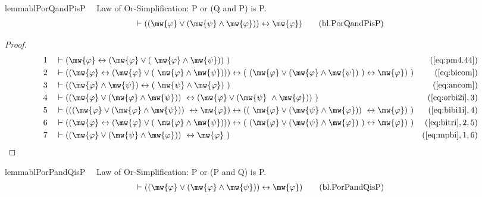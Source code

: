 \begin{restatable}{lemma}{blPorQandPisP}~~ Law of Or-Simplification: P or (Q
and P) is P.
\begin{align}
\vdash ( ( \mw{\varphi} \vee ( \mw{\psi} \wedge \mw{\varphi} ) )
    \leftrightarrow \mw{\varphi} )\label{eq:bl.PorQandPisP}\tag{bl.PorQandPisP}
\end{align}
\end{restatable}

\begin{proof}
\begin{align}
  1 &&  & \vdash ( \mw{\varphi} \leftrightarrow ( \mw{\varphi} \vee (
     ~\mw{\varphi} \wedge \mw{\psi} ) )
     ~)&(\mbox{\ref{eq:pm4.44}})\notag
  \\ 2 &&  & \vdash ( ( \mw{\varphi} \leftrightarrow ( \mw{\varphi} \vee (
     ~\mw{\varphi} \wedge \mw{\psi} ) ) ) \leftrightarrow (
     ~( \mw{\varphi} \vee ( \mw{\varphi} \wedge \mw{\psi} )
     ~) \leftrightarrow \mw{\varphi} )
     ~)&(\mbox{\ref{eq:bicom}})\notag
  \\ 3 &&  & \vdash ( ( \mw{\varphi} \wedge \mw{\psi} ) \leftrightarrow (
     ~\mw{\psi} \wedge \mw{\varphi} )
     ~)&(\mbox{\ref{eq:ancom}})\notag
  \\ 4 &&  & \vdash ( ( \mw{\varphi} \vee ( \mw{\varphi} \wedge \mw{\psi} ) )
     ~\leftrightarrow ( \mw{\varphi} \vee ( \mw{\psi}
     ~\wedge \mw{\varphi} ) )
     ~)&(\mbox{\ref{eq:orbi2i}},3)\notag
  \\ 5 &&  & \vdash ( ( ( \mw{\varphi} \vee ( \mw{\varphi} \wedge \mw{\psi} ) )
     ~\leftrightarrow \mw{\varphi} ) \leftrightarrow ( (
     ~\mw{\varphi} \vee ( \mw{\psi} \wedge \mw{\varphi} ) )
     ~\leftrightarrow \mw{\varphi} )
     ~)&(\mbox{\ref{eq:bibi1i}},4)\notag
  \\ 6 &&  & \vdash ( ( \mw{\varphi} \leftrightarrow ( \mw{\varphi} \vee (
     ~\mw{\varphi} \wedge \mw{\psi} ) ) ) \leftrightarrow (
     ~( \mw{\varphi} \vee ( \mw{\psi} \wedge \mw{\varphi} )
     ~) \leftrightarrow \mw{\varphi} )
     ~)&(\mbox{\ref{eq:bitri}},2,5)\notag
  \\ 7 &&  & \vdash ( ( \mw{\varphi} \vee ( \mw{\psi} \wedge \mw{\varphi} ) )
     ~\leftrightarrow \mw{\varphi}
     ~)&(\mbox{\ref{eq:mpbi}},1,6)\notag
\end{align}
\end{proof}

\begin{restatable}{lemma}{blPorPandQisP}~~ Law of Or-Simplification: P or (P
and Q) is P.
\begin{align}
\vdash ( ( \mw{\varphi} \vee ( \mw{\varphi} \wedge \mw{\psi} ) )
    \leftrightarrow \mw{\varphi} )\label{eq:bl.PorPandQisP}\tag{bl.PorPandQisP}
\end{align}
\end{restatable}

